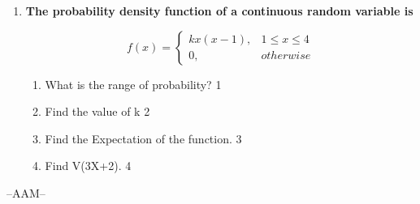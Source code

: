 \documentclass[12pt]{article}
\begin{document}
\begin{enumerate}
    \item
  \textbf{The probability density function of a continuous random variable is}

$$
  f(x) =
\begin{cases}
kx(x-1),  & 1 \le x \le 4 \\
0, & otherwise
\end{cases}
$$

  \begin{enumerate}
    \item
	What is the range of probability? \hfill 1
    \item
    	Find the value of k \hfill 2
    \item
    	Find the Expectation of the function. \hfill 3
     \item
     	Find V(3X+2).  \hfill 4
  \end{enumerate}




\end{enumerate}
 \vspace{2.5cm}

\begin{center}

  \vfill
  --AAM--
\end{center}
\end{document}
